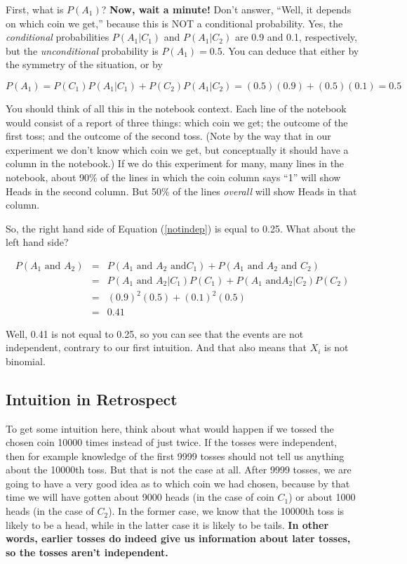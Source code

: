 First, what is $P(A_1)$?   {\bf \Large Now, wait a minute!}  Don't
answer, ``Well, it depends on which coin we get,'' because this is NOT a
conditional probability.  Yes, the {\it conditional} probabilities
$P(A_1 | C_1)$ and $P(A_1 | C_2)$ are 0.9 and 0.1, respectively, but the
{\it unconditional} probability is $P(A_1) = 0.5$.  You can deduce that
either by the symmetry of the situation, or by 

\begin{equation}
P(A_1) = P(C_1) P(A_1 |
C_1) + P(C_2) P(A_1 | C_2) = (0.5) (0.9) + (0.5) (0.1) = 0.5
\end{equation}

You should think of all this in the notebook context.  Each line of the
notebook would consist of a report of three things:  which coin we get;
the outcome of the first toss; and the outcome of the second toss.
(Note by the way that in our experiment we don't know which coin we get,
but conceptually it should have a column in the notebook.)  If we do this
experiment for many, many lines in the notebook, about 90\% of the lines
in which the coin column says ``1'' will show Heads in the second
column.  But 50\% of the lines {\it overall} will show Heads in that
column.

So, the right hand side of Equation (\ref{notindep}) is equal to 0.25.
What about the left hand side?

\begin{eqnarray}
P(A_1\textrm{ and }A_2) & = & P(A_1\textrm{ and }A_2\textrm{ and
}C_1)+P(A_1\textrm{ and }A_2\textrm{ and }C_2)\textrm{ }\label{lhs} \\
 & = & P(A_1\textrm{ and }A_2|C_1)P(C_1)+P(A_1\textrm{ and}A_2|C_2)
 P(C_2)\\
 & = & (0.9)^2(0.5)+(0.1)^{2}(0.5)\\
 & = & 0.41
\end{eqnarray}

Well, 0.41 is not equal to 0.25, so you can see that the events are not
independent, contrary to our first intuition.  And that also means that
$X_i$ is not binomial.

\subsection{Intuition in Retrospect} 

To get some intuition here, think about what would happen if we tossed
the chosen coin 10000 times instead of just twice. If the tosses were
independent, then for example knowledge of the first 9999 tosses should
not tell us anything about the 10000th toss. But that is not the case at
all. After 9999 tosses, we are going to have a very good idea as to
which coin we had chosen, because by that time we will have gotten
about 9000 heads (in the case of coin $C_1$) or about 1000 heads
(in the case of $C_2$). In the former case, we know that the
10000th toss is likely to be a head, while in the latter case it is
likely to be tails. \textbf{In other words, earlier tosses do indeed
give us information about later tosses, so the tosses aren't
independent.}

